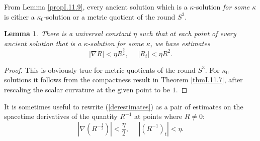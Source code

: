 \documentclass[12pt]{amsart}
\numberwithin{equation}{section}
\theoremstyle{plain}
\newtheorem{lemma}[equation]{Lemma}
\theoremstyle{definition}
\theoremstyle{remark}
\begin{document}
From Lemma \ref{propI.11.9}, every ancient solution which is a 
$\kappa$-solution {\em for some $\kappa$} is either a $\kappa_0$-solution
or a metric quotient of the round $S^3$. 

\begin{lemma} \label{derivativeestimates}
There is a universal constant
$\eta$ such that at each point of every ancient solution that is
a $\kappa$-solution for some $\kappa$, we have estimates
\begin{equation} \label{derestimates}
|\nabla R| < \eta R^{\frac32}, \: \: \: \: \: \: |R_t| < \eta R^2.
\end{equation}
\end{lemma}
\begin{proof}
This is obviously true for metric quotients of the round $S^3$. For
$\kappa_0$-solutions it follows from the compactness result in
Theorem \ref{thmI.11.7}, after rescaling the scalar curvature at
the given point to be $1$.
\end{proof}


It is sometimes useful to rewrite (\ref{derestimates}) as a pair of estimates
on the spacetime derivatives of the quantity $R^{-1}$ at points where $R\neq 0$:
\begin{equation}
\label{eqnderestimatesrinverse}
|\nabla (R^{-\frac12})| < \frac{\eta}{2}, \: \: \: \: \: \: |(R^{-1})_t| < \eta .
\end{equation} 
\end{document}
